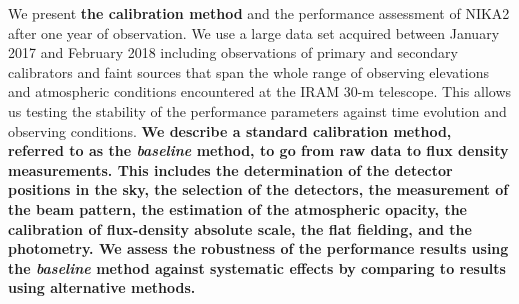 \documentclass[traditionalabstract]{aa}
\newcommand{\lp}[1]{\bf \color[RGB]{230, 0, 92} #1}
\begin{document}
       {We present {\lp the calibration method} and the performance assessment of NIKA2 after one year of observation.}
       {We use a large data set acquired between January 2017 and
         February 2018 including observations of primary and secondary
         calibrators and faint sources that span the whole range
         of observing elevations and atmospheric conditions encountered at the
         IRAM 30-m telescope. This allows us testing the stability of the
         performance parameters against time evolution and
         observing conditions. {\lp We describe a standard calibration
         method, referred to as the \emph{baseline} method, to go from
         raw data to flux density measurements. This includes the
         determination of the detector positions in the sky, the
         selection of the detectors, the measurement of
         the beam pattern, the estimation of the 
         atmospheric opacity, the calibration of flux-density absolute
         scale, the flat fielding, and the photometry. We
         assess the robustness of the performance results using the
         \emph{baseline} method against systematic effects by
         comparing to results using alternative methods.}  
       }
\end{document}
